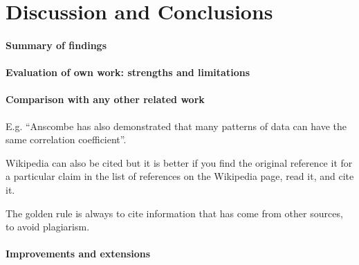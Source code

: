 \section{Discussion and Conclusions}

    \paragraph{Summary of findings}

    \paragraph{Evaluation of own work: strengths and limitations}

    \paragraph{Comparison with any other related work}
        E.g. ``Anscombe has also demonstrated that many patterns of data can have the
            same correlation coefficient''.

        Wikipedia can also be cited but it is better if you find the original reference
            it for a particular claim in the list of references on the Wikipedia page, read
            it, and cite it.

        The golden rule is always to cite information that has come from other sources,
            to avoid plagiarism.

    \paragraph{Improvements and extensions}